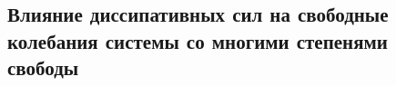 

\subsection{Влияние диссипативных сил на свободные колебания системы со многими степенями свободы}



